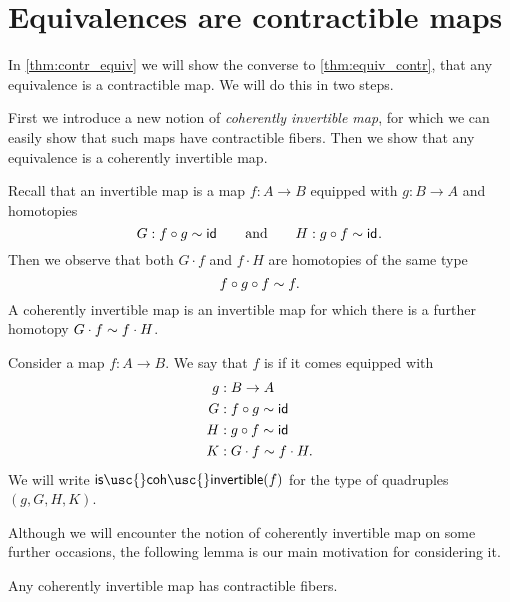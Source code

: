 \section{Equivalences are contractible maps}

In \cref{thm:contr_equiv} we will show the converse to \cref{thm:equiv_contr}, that any equivalence is a contractible map. We will do this in two steps.

First we introduce a new notion of \emph{coherently invertible map}, for which we can easily show that such maps have contractible fibers. Then we show that any equivalence is a coherently invertible map.

  Recall that an invertible map is a map $f:A\to B$ equipped with $g:B\to A$ and homotopies
  \begin{equation*}
    G : f\circ g \sim \mathsf{id}_{}\qquad\text{and}\qquad H:g\circ f\sim \mathsf{id}_{}.
  \end{equation*}
  Then we observe that both $G \cdot f$ and $f \cdot H$ are homotopies of the same type
  \begin{equation*}
    f\circ g\circ f \sim f.
  \end{equation*}
  A coherently invertible map is an invertible map for which there is a further homotopy $G \cdot f\sim f\cdot H$.

  \begin{defn}
    Consider a map $f:A\to B$. We say that $f$ is  if it comes equipped with
    \begin{align*}
      g & : B \to A \\
      G & : f \circ g \sim \mathsf{id}_{} \\
      H & : g \circ f \sim \mathsf{id}_{} \\
      K & : G \cdot f \sim f \cdot H.
    \end{align*}
    We will write $\mathsf{is\usc{}coh\usc{}invertible}(f)$ for the type of quadruples $(g,G,H,K)$.
  \end{defn}

  Although we will encounter the notion of coherently invertible map on some further occasions, the following lemma is our main motivation for considering it.

  \begin{lem}\label{lem:contr-inv}
    Any coherently invertible map has contractible fibers.
  \end{lem}

